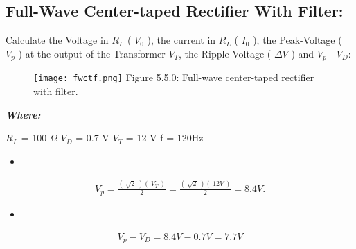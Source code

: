 \subsection{Full-Wave Center-taped Rectifier With Filter:}

Calculate the Voltage in $R_{L}$ ( $V_{0}$ ), the current in $R_{L}$ ( $I_{0}$ ), the Peak-Voltage ( $V_{p}$ ) at the output of the Transformer $V_{T}$, the Ripple-Voltage ( $\Delta V$ ) and $V_{p}$ - $V_{D}$:

\begin{figure}[H]
\texttt{[image: fwctf.png]}
\centering \linebreak \linebreak Figure 5.5.0: Full-wave center-taped rectifier with filter.
\end{figure}

{\bfseries\itshape Where:
\begin{tasks}
\task $R_{L}$ = 100 $\Omega$
\task $V_{D}$ = 0.7 V
\task $V_{T}$ = 12 V
\task f = 120Hz 
\end{tasks}} \hfill

{\bfseries\itshape\color{Maroon}{Solution:}} \hfill \break

\begin{itemize}
\item {\bfseries\itshape\color{Violet}{For peak voltage at the transformer output:}} \hfill \break
{\bfseries\itshape{}}
\end{itemize}

\begin{ceqn}
\begin{align}
V_{p} = \frac{(\ \sqrt{2}\ )(\ V_{T}\ )}{2} = \frac{(\ \sqrt{2}\ )(\ 12 V\ )}{2} = 8.4 V.
\end{align}
\end{ceqn}

\begin{itemize}
\item {\bfseries\itshape{}} \hfill \break
\end{itemize}

\begin{ceqn}
\begin{align}
V_{p} - V_{D} = 8.4 V - 0.7V = 7.7 V
\end{align}
\end{ceqn}

